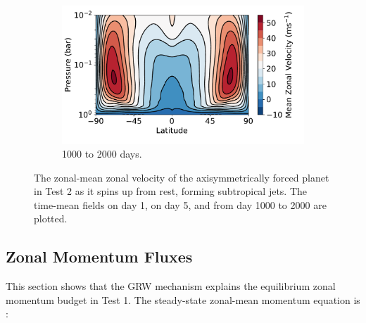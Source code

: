 \begin{figure}
\begin{subfigure}[t]{0.31\textwidth}
    \includegraphics[width=1.0\textwidth]{figures/eqm-zonal-flow/default-gcm-axi-zonal-flow.pdf}
    \caption{1000 to 2000 days.}
  \end{subfigure}
  \caption{The zonal-mean zonal velocity of the axisymmetrically forced planet in Test 2 as it spins up from rest, forming subtropical jets. The time-mean fields on day 1, on day 5, and from day 1000 to 2000 are plotted.}\label{fig:test-2-spinup}
\end{figure}



%



\subsection{Zonal Momentum Fluxes}

This section shows that the GRW mechanism explains the equilibrium zonal momentum budget in Test 1. The steady-state zonal-mean momentum equation is \citep{lutsko2018response}:

